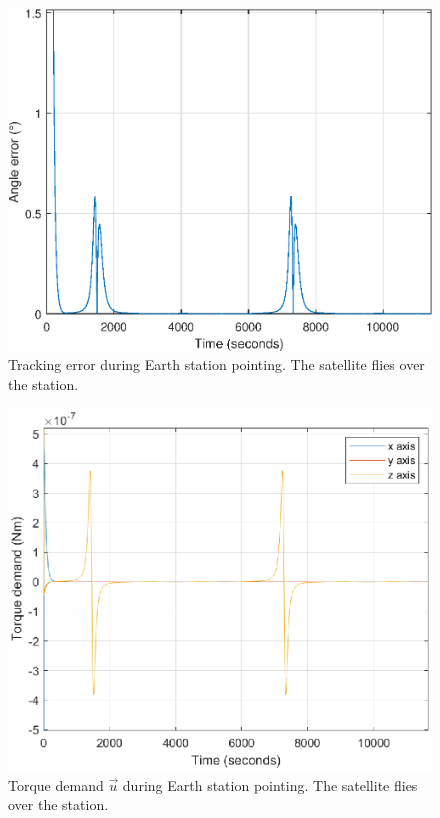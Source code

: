 \begin{figure}[H]
	\centering
	\includegraphics[width=0.7\linewidth]{figures/angle_error_stationTrack}
	\caption{Tracking error during Earth station pointing. The satellite flies over the station.}
	\label{fig:angle_error2}
\end{figure}


\begin{figure}[H]
	\centering
	\includegraphics[width=0.7\linewidth]{figures/torque_stationTrack}
	\caption{Torque demand $\vec{u}$ during Earth station pointing. The satellite flies over the station.}
	\label{fig:torque_stationTrack}
\end{figure}

